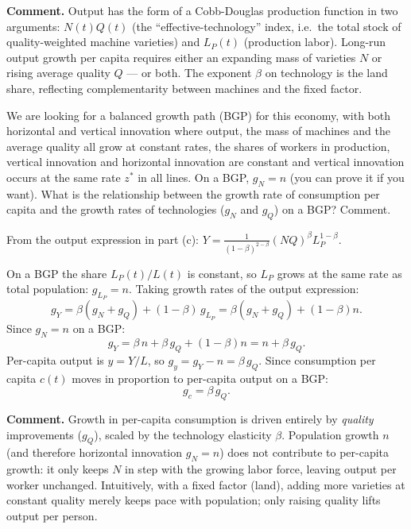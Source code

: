 \documentclass[11pt]{exam}
\begin{document}
\begin{questions}
\begin{solution}
\textbf{Comment.}  Output has the form of a Cobb-Douglas production function in two arguments: $N(t)Q(t)$ (the ``effective-technology'' index, i.e.\ the total stock of quality-weighted machine varieties) and $L_{P}(t)$ (production labor).  Long-run output growth per capita requires either an expanding mass of varieties $N$ or rising average quality $Q$ — or both.  The exponent $\beta$ on technology is the land share, reflecting complementarity between machines and the fixed factor.
\end{solution}

\question We are looking for a balanced growth path (BGP) for this economy, with both horizontal and vertical innovation where output, the mass of machines and the average quality all grow at constant rates, the shares of workers in production, vertical innovation and horizontal innovation are constant and vertical innovation occurs at the same rate $z^{*}$ in all lines. On a BGP, $g_{N}=n$ (you can prove it if you want). What is the relationship between the growth rate of consumption per capita and the growth rates of technologies ($g_{N}$ and $g_{Q}$) on a BGP? Comment.
\begin{solution}
From the output expression in part (c): $Y=\frac{1}{(1-\beta)^{2-\beta}}(NQ)^{\beta}L_{P}^{1-\beta}$.

On a BGP the share $L_{P}(t)/L(t)$ is constant, so $L_{P}$ grows at the same rate as total population: $g_{L_{P}}=n$.  Taking growth rates of the output expression:
\[
	g_{Y} = \beta(g_{N}+g_{Q})+(1-\beta)\,g_{L_{P}} = \beta(g_{N}+g_{Q})+(1-\beta)n.
\]
Since $g_{N}=n$ on a BGP:
\[
	g_{Y} = \beta\,n + \beta\,g_{Q} + (1-\beta)n = n + \beta\,g_{Q}.
\]
Per-capita output is $y=Y/L$, so $g_{y}=g_{Y}-n=\beta\,g_{Q}$.  Since consumption per capita $c(t)$ moves in proportion to per-capita output on a BGP:
\[
	\boxed{g_{c} = \beta\,g_{Q}.}
\]

\textbf{Comment.}  Growth in per-capita consumption is driven entirely by \emph{quality} improvements ($g_{Q}$), scaled by the technology elasticity $\beta$.  Population growth $n$ (and therefore horizontal innovation $g_{N}=n$) does not contribute to per-capita growth: it only keeps $N$ in step with the growing labor force, leaving output per worker unchanged.  Intuitively, with a fixed factor (land), adding more varieties at constant quality merely keeps pace with population; only raising quality lifts output per person.
\end{solution}


\end{questions}
\end{document}
